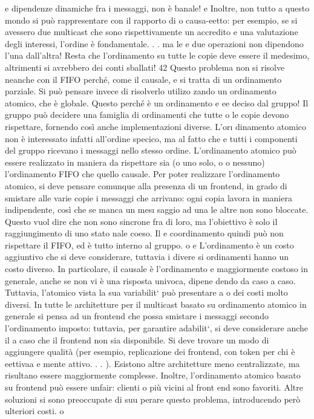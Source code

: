 e
dipendenze dinamiche fra i messaggi, non è banale!
e
Inoltre, non tutto a questo mondo si può rappresentare con il rapporto di
o
causa-eetto: per esempio, se si avessero due multicast che sono rispettivamente
un accredito e una valutazione degli interessi, l'ordine è fondamentale. . . ma le
e
due operazioni non dipendono l'una dall'altra! Resta che l'ordinamento su tutte
le copie deve essere il medesimo, altrimenti si avrebbero dei conti sballati!
42
Questo problema non si risolve neanche con il FIFO perché, come il causale,
e
si tratta di un ordinamento parziale. Si può pensare invece di risolverlo utilizo
zando un ordinamento atomico, che è globale. Questo perché è un ordinamento
e
ee
deciso dal gruppo! Il gruppo può decidere una famiglia di ordinamenti che tutte
o
le copie devono rispettare, fornendo così anche implementazioni diverse. L'or\i{}
dinamento atomico non è interessato infatti all'ordine specico, ma al fatto che
e
tutti i componenti del gruppo ricevano i messaggi nello stesso ordine. L'ordinamento atomico può essere realizzato in
maniera da rispettare sia (o uno solo, o
o
nessuno) l'ordinamento FIFO che quello causale.
Per poter realizzare l'ordinamento atomico, si deve pensare comunque alla
presenza di un frontend, in grado di smistare alle varie copie i messaggi che
arrivano: ogni copia lavora in maniera indipendente, così che se manca un mes\i{}
saggio ad una le altre non sono bloccate. Questo vuol dire che non sono sincrone
fra di loro, ma l'obiettivo è solo il raggiungimento di uno stato nale coeso. Il
e
coordinamento quindi può non rispettare il FIFO, ed è tutto interno al gruppo.
o
e
L'ordinamento è un costo aggiuntivo che si deve considerare, tuttavia i divere
si ordinamenti hanno un costo diverso. In particolare, il causale è l'ordinamento
e
maggiormente costoso in generale, anche se non vi è una risposta univoca, dipene
dendo da caso a caso. Tuttavia, l'atomico vista la sua variabilit` può presentare
a o
dei costi molto diversi.
In tutte le architetture per il multicast basato su ordinamento atomico in
generale si pensa ad un frontend che possa smistare i messaggi secondo l'ordinamento imposto: tuttavia, per garantire
adabilit`, si deve considerare anche il
a
caso che il frontend non sia disponibile. Si deve trovare un modo di aggiungere
qualità (per esempio, replicazione dei frontend, con token per chi è eettivaa
e
mente attivo. . . ). Esistono altre architetture meno centralizzate, ma risultano
essere maggiormente complesse.
Inoltre, l'ordinamento atomico basato su frontend può essere unfair: clienti
o
più vicini al front end sono favoriti. Altre soluzioni si sono preoccupate di suu
perare questo problema, introducendo però ulteriori costi.
o
